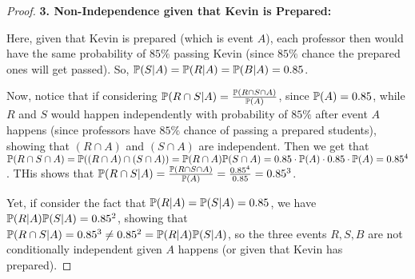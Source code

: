 \documentclass{article}
\begin{document}
\begin{proof}
    \hfil

    \textbf{3. Non-Independence given that Kevin is Prepared:}

    Here, given that Kevin is prepared (which is event $A$), each professor then would have the same probability of $85\%$ passing Kevin (since $85\%$ chance the prepared ones will get passed). So, $\mathbb{P}(S|A)=\mathbb{P}(R|A)=\mathbb{P}(B|A)=0.85$.

    Now, notice that if considering $\mathbb{P}(R\cap S|A) = \frac{\mathbb{P}(R\cap S\cap A)}{\mathbb{P}(A)}$, since $\mathbb{P}(A)=0.85$, while $R$ and $S$ would happen independently with probability of $85\%$ after event $A$ happens (since professors have $85\%$ chance of passing a prepared students), showing that $(R\cap A)$ and $(S\cap A)$ are independent. Then we get that $\mathbb{P}(R\cap S\cap A)=\mathbb{P}((R\cap A)\cap (S\cap A))=\mathbb{P}(R\cap A)\mathbb{P}(S\cap A) = 0.85\cdot \mathbb{P}(A)\cdot 0.85\cdot \mathbb{P}(A) = 0.85^4$. THis shows that $\mathbb{P}(R\cap S|A)=\frac{\mathbb{P}(R\cap S\cap A)}{\mathbb{P}(A)}=\frac{0.85^4}{0.85}=0.85^3$.

    Yet, if consider the fact that $\mathbb{P}(R|A)=\mathbb{P}(S|A)=0.85$, we have $\mathbb{P}(R|A)\mathbb{P}(S|A)=0.85^2$, showing that $\mathbb{P}(R\cap S|A) = 0.85^3\neq 0.85^2=\mathbb{P}(R|A)\mathbb{P}(S|A)$, so the three events $R,S,B$ are not conditionally independent given $A$ happens (or given that Kevin has prepared).
\end{proof}
\end{document}
